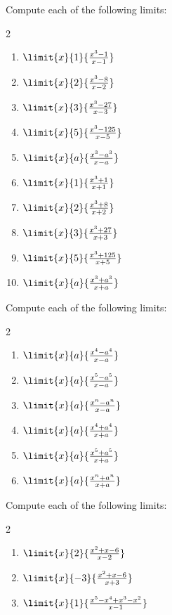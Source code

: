 \begin{ProblemSection}
    \begin{embeddedproblem}{}
      Compute each of the following limits:
      \begin{multicols}{2}
        \begin{enumerate}[label={\bf{}(\alph*)}]
        \item $\limit{x}{1}{\frac{x^3-1}{x-1}}$
        \item $\limit{x}{2}{\frac{x^3-8}{x-2}}$
        \item $\limit{x}{3}{\frac{x^3-27}{x-3}}$
        \item $\limit{x}{5}{\frac{x^3-125}{x-5}}$
        \item $\limit{x}{a}{\frac{x^3-a^3}{x-a}}$
        \item $\limit{x}{1}{\frac{x^3+1}{x+1}}$
        \item $\limit{x}{2}{\frac{x^3+8}{x+2}}$
        \item $\limit{x}{3}{\frac{x^3+27}{x+3}}$
        \item $\limit{x}{5}{\frac{x^3+125}{x+5}}$
        \item $\limit{x}{a}{\frac{x^3+a^3}{x+a}}$
        \end{enumerate}
      \end{multicols}
    \end{embeddedproblem}
    
    \begin{embeddedproblem}{}
      Compute each of the following limits:
      \begin{multicols}{2}
        \begin{enumerate}[label={\bf{}(\alph*)}]
        \item $\limit{x}{a}{\frac{x^4-a^4}{x-a}}$
        \item $\limit{x}{a}{\frac{x^5-a^5}{x-a}}$
        \item $\limit{x}{a}{\frac{x^n-a^n}{x-a}}$
        \item $\limit{x}{a}{\frac{x^4+a^4}{x+a}}$
        \item $\limit{x}{a}{\frac{x^5+a^5}{x+a}}$
        \item $\limit{x}{a}{\frac{x^n+a^n}{x+a}}$
        \end{enumerate}
      \end{multicols}
    \end{embeddedproblem}
    
    \begin{embeddedproblem}{}
      Compute each of the following limits:
      \begin{multicols}{2}
        \begin{enumerate}[label={\bf{}(\alph*)}]
        \item $\limit{x}{2}{\frac{x^2+x-6}{x-2}}$
        \item $\limit{x}{-3}{\frac{x^2+x-6}{x+3}}$
        \item $\limit{x}{1}{\frac{x^5-x^4+x^3-x^2}{x-1}}$
        \end{enumerate}
      \end{multicols}
    \end{embeddedproblem}
    

\end{ProblemSection}
